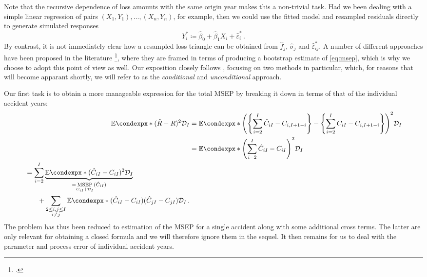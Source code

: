\documentclass[a4paper]{book}
\theoremstyle{plain}
\newcommand{\condexp}{\mathbb{E}\condexpx}
\begin{document}
Note that the recursive dependence of loss amounts with the same origin year makes this a non-trivial task. Had we been dealing with a simple linear regression of pairs ${(X_1, Y_1), \dots, (X_n, Y_n)}$, for example, then we could use the fitted model and resampled residuals directly to generate simulated responses
\begin{equation}
    Y^*_i \coloneqq \hat{\beta}_0 + \hat{\beta}_1 X_i + \hat{\varepsilon}^*_i \,.
\end{equation}
By contrast, it is not immediately clear how a resampled loss triangle can be obtained from $\hat{f}_j$, $\hat{\sigma}_j$ and $\hat{\varepsilon}^*_{ij}$. A number of different approaches have been proposed in the literature  \footcites[See, for example,][Section~D6]{mack:chain-ladder-variability}{wuthrich:chain-ladder-msep}, where they are framed in terms of producing a bootstrap estimate of \eqref{eq:msep}, which is why we choose to adopt this point of view as well. Our exposition closely follows \cite[45\psqq]{wuthrich:stochastic-reserving}, focusing on two methods in particular, which, for reasons that will become apparant shortly, we will refer to as the \emph{conditional} and \emph{unconditional} approach.

Our first task is to obtain a more manageable expression for the total MSEP by breaking it down in terms of that of the individual accident years:
\begin{align}
    \condexp*{(\hat{R} - R)^2}{\mathcal{D}_I} &=
        \condexp*{\left( \left \lbrace \sum_{i=2}^I \hat{C}_{iI} - C_{i, I + 1 - i} \right \rbrace - \left \lbrace \sum_{i=2}^I C_{iI} - C_{i, I + 1 - i} \right \rbrace \right) ^2}{\mathcal{D}_I} \\
    &= \condexp*{\left( \sum_{i=2}^I \hat{C}_{iI} - C_{iI} \right)^2}{\mathcal{D}_I} \\
    \begin{split} \label{eq:msep-decomposition}
    &= \sum_{i=2}^I \underbrace{\condexp*{(\hat{C}_{iI} - C_{iI})^2}{\mathcal{D}_I}}_{= \underset{C_{iI} \, \vert \, \mathcal{D}_I}{\mathrm{MSEP}}(\hat{C}_{iI})} \\
    &\phantom{{}=1} + \sum_{\substack{2 \leq i, j \leq I \\ i \neq j}} \condexp*{(\hat{C}_{iI} - C_{iI})(\hat{C}_{jI} - C_{jI})}{\mathcal{D}_I} \,.
    \end{split}
\end{align}
The problem has thus been reduced to estimation of the MSEP for a single accident along with some additional cross terms. The latter are only relevant for obtaining a closed formula and we will therefore ignore them in the sequel. It then remains for us to deal with the parameter and process error of individual accident years.
\end{document}
